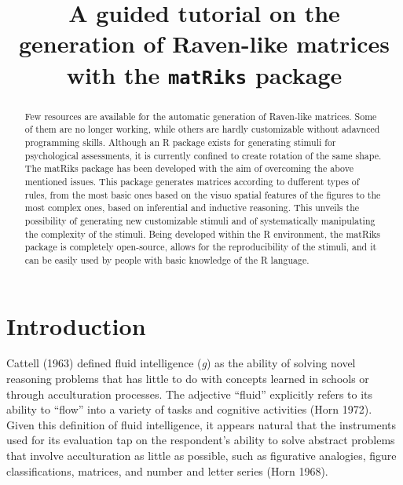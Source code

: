 \documentclass[
]{article}
\title{A guided tutorial on the generation of Raven-like matrices with
the \texttt{matRiks} package}
\author{}
\date{\vspace{-2.5em}}
\begin{document}
\maketitle
\begin{abstract}
Few resources are available for the automatic generation of Raven-like
matrices. Some of them are no longer working, while others are hardly
customizable without adavnced programming skills. Although an R package
exists for generating stimuli for psychological assessments, it is
currently confined to create rotation of the same shape. The matRiks
package has been developed with the aim of overcoming the above
mentioned issues. This package generates matrices according to dufferent
types of rules, from the most basic ones based on the visuo spatial
features of the figures to the most complex ones, based on inferential
and inductive reasoning. This unveils the possibility of generating new
customizable stimuli and of systematically manipulating the complexity
of the stimuli. Being developed within the R environment, the matRiks
package is completely open-source, allows for the reproducibility of the
stimuli, and it can be easily used by people with basic knowledge of the
R language.
\end{abstract}

\section{Introduction}\label{introduction}

Cattell (1963) defined fluid intelligence (\emph{g}) as the ability of
solving novel reasoning problems that has little to do with concepts
learned in schools or through acculturation processes. The adjective
``fluid'' explicitly refers to its ability to ``flow'' into a variety of
tasks and cognitive activities (Horn 1972). Given this definition of
fluid intelligence, it appears natural that the instruments used for its
evaluation tap on the respondent's ability to solve abstract problems
that involve acculturation as little as possible, such as figurative
analogies, figure classifications, matrices, and number and letter
series (Horn 1968).
\end{document}
